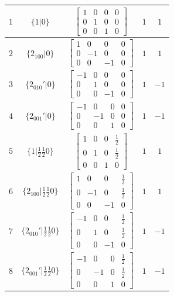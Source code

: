 \documentclass[fleqn,8pt]{jsarticle}
\begin{document}
\begin{longtable}{ccccc}
$ 1 $ & $ \{1|0\} $ & $ \begin{bmatrix} 1 & 0 & 0 & 0 \\ 0 & 1 & 0 & 0 \\ 0 & 0 & 1 & 0 \end{bmatrix} $ & $ 1 $ & $ 1 $ \\ \hline
$ 2 $ & $ \{2{}_{100}|0\} $ & $ \begin{bmatrix} 1 & 0 & 0 & 0 \\ 0 & -1 & 0 & 0 \\ 0 & 0 & -1 & 0 \end{bmatrix} $ & $ 1 $ & $ 1 $ \\ \hline
$ 3 $ & $ \{2{}_{010}{}'|0\} $ & $ \begin{bmatrix} -1 & 0 & 0 & 0 \\ 0 & 1 & 0 & 0 \\ 0 & 0 & -1 & 0 \end{bmatrix} $ & $ 1 $ & $ -1 $ \\ \hline
$ 4 $ & $ \{2{}_{001}{}'|0\} $ & $ \begin{bmatrix} -1 & 0 & 0 & 0 \\ 0 & -1 & 0 & 0 \\ 0 & 0 & 1 & 0 \end{bmatrix} $ & $ 1 $ & $ -1 $ \\ \hline
$ 5 $ & $ \{1|\frac{1}{2} \frac{1}{2} 0\} $ & $ \begin{bmatrix} 1 & 0 & 0 & \frac{1}{2} \\ 0 & 1 & 0 & \frac{1}{2} \\ 0 & 0 & 1 & 0 \end{bmatrix} $ & $ 1 $ & $ 1 $ \\ \hline
$ 6 $ & $ \{2{}_{100}|\frac{1}{2} \frac{1}{2} 0\} $ & $ \begin{bmatrix} 1 & 0 & 0 & \frac{1}{2} \\ 0 & -1 & 0 & \frac{1}{2} \\ 0 & 0 & -1 & 0 \end{bmatrix} $ & $ 1 $ & $ 1 $ \\ \hline
$ 7 $ & $ \{2{}_{010}{}'|\frac{1}{2} \frac{1}{2} 0\} $ & $ \begin{bmatrix} -1 & 0 & 0 & \frac{1}{2} \\ 0 & 1 & 0 & \frac{1}{2} \\ 0 & 0 & -1 & 0 \end{bmatrix} $ & $ 1 $ & $ -1 $ \\ \hline
$ 8 $ & $ \{2{}_{001}{}'|\frac{1}{2} \frac{1}{2} 0\} $ & $ \begin{bmatrix} -1 & 0 & 0 & \frac{1}{2} \\ 0 & -1 & 0 & \frac{1}{2} \\ 0 & 0 & 1 & 0 \end{bmatrix} $ & $ 1 $ & $ -1 $ \\
\end{longtable}
\end{document}
